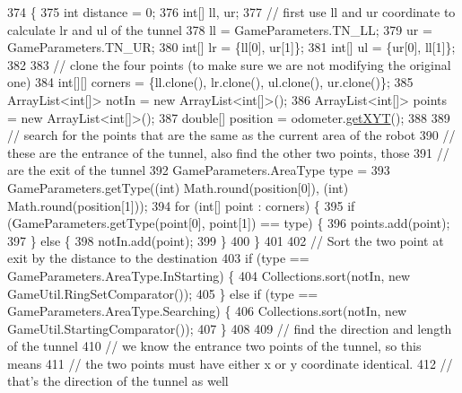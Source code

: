 \begin{DoxyCode}
374                                                  \{
375     \textcolor{keywordtype}{int} distance = 0;
376     \textcolor{keywordtype}{int}[] ll, ur;
377     \textcolor{comment}{// first use ll and ur coordinate to calculate lr and ul of the tunnel}
378     ll = GameParameters.TN\_LL;
379     ur = GameParameters.TN\_UR;
380     \textcolor{keywordtype}{int}[] lr = \{ll[0], ur[1]\};
381     \textcolor{keywordtype}{int}[] ul = \{ur[0], ll[1]\};
382 
383     \textcolor{comment}{// clone the four points (to make sure we are not modifying the original one)}
384     \textcolor{keywordtype}{int}[][] corners = \{ll.clone(), lr.clone(), ul.clone(), ur.clone()\};
385     ArrayList<int[]> notIn = \textcolor{keyword}{new} ArrayList<int[]>();
386     ArrayList<int[]> points = \textcolor{keyword}{new} ArrayList<int[]>();
387     \textcolor{keywordtype}{double}[] position = odometer.\hyperlink{classca_1_1mcgill_1_1ecse211_1_1odometer_1_1_odometer_data_a8f40f0264c68f0cbed4fff1723ae7863}{getXYT}();
388 
389     \textcolor{comment}{// search for the points that are the same as the current area of the robot}
390     \textcolor{comment}{// these are the entrance of the tunnel, also find the other two points, those}
391     \textcolor{comment}{// are the exit of the tunnel}
392     GameParameters.AreaType type =
393         GameParameters.getType((\textcolor{keywordtype}{int}) Math.round(position[0]), (int) Math.round(position[1]));
394     \textcolor{keywordflow}{for} (\textcolor{keywordtype}{int}[] point : corners) \{
395       \textcolor{keywordflow}{if} (GameParameters.getType(point[0], point[1]) == type) \{
396         points.add(point);
397       \} \textcolor{keywordflow}{else} \{
398         notIn.add(point);
399       \}
400     \}
401 
402     \textcolor{comment}{// Sort the two point at exit by the distance to the destination}
403     \textcolor{keywordflow}{if} (type == GameParameters.AreaType.InStarting) \{
404       Collections.sort(notIn, \textcolor{keyword}{new} GameUtil.RingSetComparator());
405     \} \textcolor{keywordflow}{else} \textcolor{keywordflow}{if} (type == GameParameters.AreaType.Searching) \{
406       Collections.sort(notIn, \textcolor{keyword}{new} GameUtil.StartingComparator());
407     \}
408 
409     \textcolor{comment}{// find the direction and length of the tunnel}
410     \textcolor{comment}{// we know the entrance two points of the tunnel, so this means}
411     \textcolor{comment}{// the two points must have either x or y coordinate identical.}
412     \textcolor{comment}{// that's the direction of the tunnel as well}

\end{DoxyCode}
